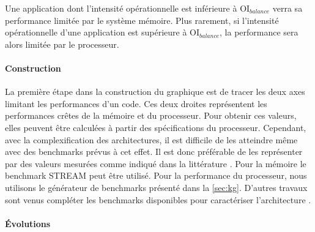             Une application dont l’intensité opérationnelle est inférieure à $\text{OI}_{balance}$ verra sa performance limitée par le système mémoire. Plus rarement, si l’intensité opérationnelle d’une application est supérieure à $\text{OI}_{balance}$, la performance sera alors limitée par le processeur.

        \paragraph{Construction}

            La première étape dans la construction du graphique est de tracer les deux axes limitant les performances d’un code. Ces deux droites représentent les performances crêtes de la mémoire et du processeur. Pour obtenir ces valeurs, elles peuvent être calculées à partir des spécifications du processeur. Cependant, avec la complexification des architectures, il est difficile de les atteindre même avec des benchmarks prévus à cet effet. Il est donc préférable de les représenter par des valeurs mesurées comme indiqué dans la littérature  \cite{farjallah2014preparing}. Pour la mémoire le benchmark STREAM peut être utilisé. Pour la performance du processeur, nous utilisons le générateur de benchmarks présenté dans la \autoref{sec:kg}. D’autres travaux sont venus compléter les benchmarks disponibles pour caractériser l’architecture \cite{lo2014roofline}.
        
        \paragraph{Évolutions}

